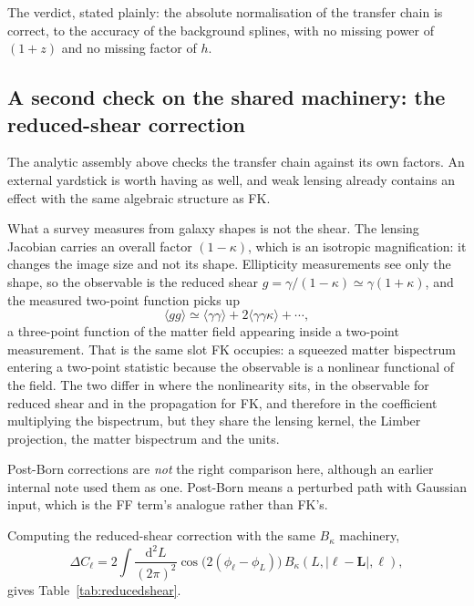 The verdict, stated plainly: the absolute normalisation of the transfer
chain is correct, to the accuracy of the background splines, with no
missing power of $(1+z)$ and no missing factor of $h$.

\subsection{A second check on the shared machinery: the reduced-shear correction}
\label{sec:reducedshear}

The analytic assembly above checks the transfer chain against its own
factors. An external yardstick is worth having as well, and weak lensing
already contains an effect with the same algebraic structure as FK.

What a survey measures from galaxy shapes is not the shear. The lensing
Jacobian carries an overall factor $(1-\kappa)$, which is an isotropic
magnification: it changes the image size and not its shape. Ellipticity
measurements see only the shape, so the observable is the reduced shear
$g = \gamma/(1-\kappa) \simeq \gamma(1+\kappa)$, and the measured two-point
function picks up
\[
  \langle gg\rangle \simeq \langle\gamma\gamma\rangle
  + 2\langle\gamma\gamma\kappa\rangle + \cdots ,
\]
a three-point function of the matter field appearing inside a two-point
measurement. That is the same slot FK occupies: a squeezed matter
bispectrum entering a two-point statistic because the observable is a
nonlinear functional of the field. The two differ in where the
nonlinearity sits, in the observable for reduced shear and in the
propagation for FK, and therefore in the coefficient multiplying the
bispectrum, but they share the lensing kernel, the Limber projection, the
matter bispectrum and the units.

Post-Born corrections are \emph{not} the right comparison here, although an
earlier internal note used them as one. Post-Born means a perturbed path
with Gaussian input, which is the FF term's analogue rather than FK's.

Computing the reduced-shear correction with the same $B_\kappa$ machinery,
\[
  \Delta C_\ell = 2\!\int\!\frac{\mathrm{d}^2L}{(2\pi)^2}
    \cos\!\big(2(\phi_\ell - \phi_L)\big)\,
    B_\kappa(L, |\boldsymbol{\ell} - \boldsymbol{L}|, \ell),
\]
gives Table~\ref{tab:reducedshear}.

